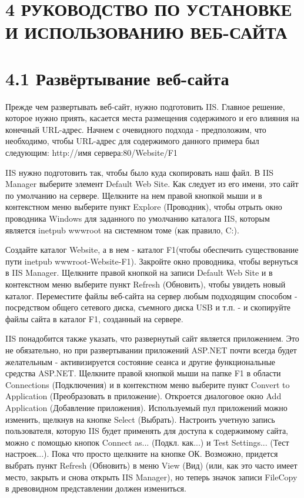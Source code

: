 \documentclass[14pt,a4paper]{extreport}
\begin{document}
           \section*{\normalsize\hspace{4ex}4 РУКОВОДСТВО ПО УСТАНОВКЕ И ИСПОЛЬЗОВАНИЮ ВЕБ-САЙТА}
 	\section*{\normalsize\hspace{4ex}4.1 Развёртывание веб-сайта}
\flushleft\parindent=1cm Прежде чем развертывать веб-сайт, нужно подготовить IIS. Главное решение, которое нужно приять, касается места размещения содержимого и его влияния на конечный URL-адрес. Начнем с очевидного подхода - предположим, что необходимо, чтобы URL-адрес для содержимого данного примера был следующим: http://имя сервера:80/Website/F1\par
IIS нужно подготовить так, чтобы было куда скопировать наш файл. В IIS Manager выберите элемент Default Web Site. Как следует из его имени, это сайт по умолчанию на сервере. Щелкните на нем правой кнопкой мыши и в контекстном меню выберите пункт Explore (Проводник), чтобы отрыть окно проводника Windows для заданного по умолчанию каталога IIS, которым является inetpub wwwroot на системном томе (как правило, C:).\par
Создайте каталог Website, а в нем - каталог F1(чтобы обеспечить существование пути inetpub wwwroot-Website-F1). Закройте окно проводника, чтобы вернуться в IIS Manager. Щелкните правой кнопкой на записи Default Web Site и в контекстном меню выберите пункт Refresh (Обновить), чтобы увидеть новый каталог. Переместите файлы веб-сайта на сервер любым подходящим способом - посредством общего сетевого диска, съемного диска USB и т.п. - и скопируйте файлы сайта в каталог F1, созданный на сервере.\par
IIS понадобится также указать, что развернутый сайт является приложением. Это не обязательно, но при развертывании приложений ASP.NET почти всегда будет желательным - активизируется состояние сеанса и другие функциональные средства ASP.NET. Щелкните правой кнопкой мыши на папке F1 в области Connections (Подключения) и в контекстном меню выберите пункт Convert to Application (Преобразовать в приложение). Откроется диалоговое окно Add Application (Добавление приложения). Используемый пул приложений можно изменить, щелкнув на кнопке Select (Выбрать). Настроить учетную запись пользователя, которую IIS будет применять для доступа к содержимому сайта, можно с помощью кнопок Connect as... (Подкл. как...) и Test Settings... (Тест настроек...). Пока что просто щелкните на кнопке ОК. Возможно, придется выбрать пункт Refresh (Обновить) в меню View (Вид) (или, как это часто имеет место, закрыть и снова открыть IIS Manager), но теперь значок записи FileCopy в древовидном представлении должен измениться.\par
\end{document}
